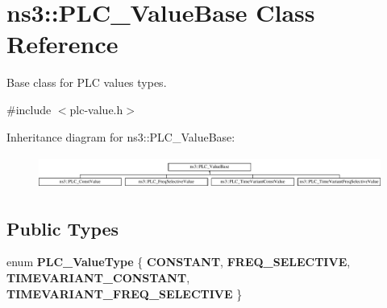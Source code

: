 \hypertarget{classns3_1_1PLC__ValueBase}{\section{ns3\-:\-:\-P\-L\-C\-\_\-\-Value\-Base \-Class \-Reference}
\label{classns3_1_1PLC__ValueBase}
}


\-Base class for \-P\-L\-C values types.  




{\ttfamily \#include $<$plc-\/value.\-h$>$}

\-Inheritance diagram for ns3\-:\-:\-P\-L\-C\-\_\-\-Value\-Base\-:\begin{figure}[H]
\begin{center}
\leavevmode
\includegraphics[height=1.098039cm]{classns3_1_1PLC__ValueBase}
\end{center}
\end{figure}
\subsection*{\-Public \-Types}
\begin{DoxyCompactItemize}
\item 
enum {\bfseries \-P\-L\-C\-\_\-\-Value\-Type} \{ {\bfseries \-C\-O\-N\-S\-T\-A\-N\-T}, 
{\bfseries \-F\-R\-E\-Q\-\_\-\-S\-E\-L\-E\-C\-T\-I\-V\-E}, 
{\bfseries \-T\-I\-M\-E\-V\-A\-R\-I\-A\-N\-T\-\_\-\-C\-O\-N\-S\-T\-A\-N\-T}, 
{\bfseries \-T\-I\-M\-E\-V\-A\-R\-I\-A\-N\-T\-\_\-\-F\-R\-E\-Q\-\_\-\-S\-E\-L\-E\-C\-T\-I\-V\-E}
 \}
\end{DoxyCompactItemize}
